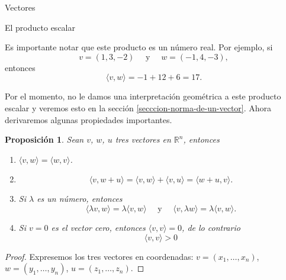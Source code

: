 \documentclass[a4paper,12pt,twoside,spanish,reqno]{amsbook}
\numberwithin{equation}{section}
\newtheorem{proposicion}[teorema]{Proposici\'on}
\theoremstyle{definition}
\theoremstyle{remark}
\newcommand{\R}{\mathbb R}
\begin{document}
\begin{chapter}{Vectores}
\begin{section}{El producto escalar}
        
        
        Es importante notar  que este producto es un número real. Por ejemplo, si
        \begin{equation*}
            v= (1, 3, - 2) \quad\text{ y } \quad w= (- 1, 4, - 3),
        \end{equation*}
        entonces
        \begin{equation*}
            \langle v , w \rangle= - 1 + 12 + 6 = 17.
        \end{equation*}
        
        Por el momento, no le damos una interpretación geométrica a este producto escalar y veremos esto en la sección \ref{secccion-norma-de-un-vector}. Ahora derivaremos algunas propiedades importantes.
        
        \begin{proposicion}
           Sean $v$, $w$, $u$  tres vectores en $\R^n$, entonces
     
        \begin{enumerate}[label=\textbf{P\arabic*.},ref=P\arabic*]
            \item\label{prop-P1}	$\langle v , w \rangle = \langle w , v \rangle$.
            \item\label{prop-P2} 
            \begin{equation*}
                \langle v , w + u \rangle =\langle v , w \rangle + \langle v , u \rangle = \langle w +u , v \rangle.
            \end{equation*}
            \item\label{prop-P3} Si $\lambda$ es un número, entonces 
            \begin{equation*}
                \langle \lambda v , w \rangle = \lambda \langle v , w \rangle \quad \text{ y } \quad  \langle v , \lambda w \rangle = \lambda \langle v , w \rangle.
            \end{equation*}
            \item\label{prop-P4} Si $v=0$ es el vector cero, entonces $\langle v , v \rangle =0$,  de lo contrario
            \begin{equation*}
                \langle v , v \rangle >0
            \end{equation*}
        \end{enumerate}
        \end{proposicion}
        \begin{proof} Expresemos los tres vectores en coordenadas:  $v = (x_1, \ldots,x_n)$, $w =  (y_1, \ldots, y_n)$, $u = (z_1, \ldots, z_n)$. 


\end{proof}
\end{section}
\end{chapter}
\end{document}
